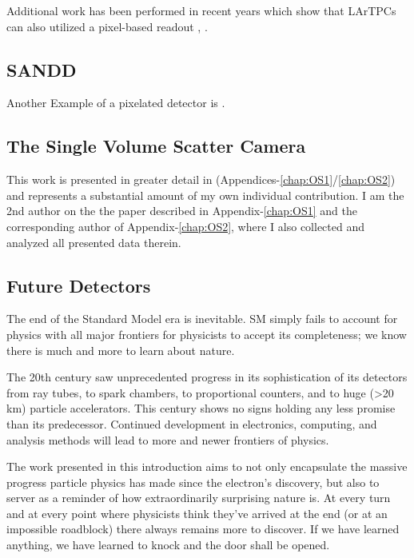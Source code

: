 
Additional work has been performed in recent years which show that LArTPCs can also utilized a pixel-based readout \citep{larpix:Dwyer_2018}, \citep{Asaadi_2018}.

\subsection{SANDD}

Another Example of a pixelated detector is \citep{SUTANTO2021_sandd_165409}.


\subsection{The Single Volume Scatter Camera}

This work is presented in greater detail in (Appendices-\ref{chap:OS1}/\ref{chap:OS2}) and represents a substantial amount of my own individual contribution. 
I am the 2nd author on the the paper described in Appendix-\ref{chap:OS1} and the corresponding author of Appendix-\ref{chap:OS2}, where I also collected and analyzed all presented data therein.

\subsection{Future Detectors}

The end of the Standard Model era is inevitable.
SM simply fails to account for physics with all major frontiers for physicists to accept its completeness; we know there is much and more to learn about nature.

The 20th century saw unprecedented progress in its sophistication of its detectors from ray tubes, to spark chambers, to proportional counters, and to huge (>20 km) particle accelerators.
This century shows no signs holding any less promise than its predecessor.
Continued development in electronics, computing, and analysis methods will lead to more and newer frontiers of physics.

The work presented in this introduction aims to not only encapsulate the massive progress particle physics has made since the electron's discovery, but also to server as a reminder of how extraordinarily surprising nature is.
At every turn and at every point where physicists think they've arrived at the end (or at an impossible roadblock) there always remains more to discover.
If we have learned anything, we have learned to knock and the door shall be opened.

